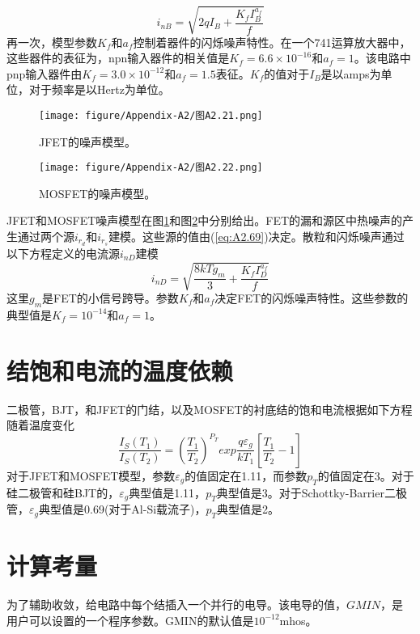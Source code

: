 \begin{equation}
    i_{nB} = \sqrt{2qI_B + \frac{K_fI^{a_f}_B}{f}}
    \label{eq:A2.72}
\end{equation}
再一次，模型参数$K_f$和$a_f$控制着器件的闪烁噪声特性。在一个741运算放大器\cite{ref-9}中，这些器件的表征为，npn输入器件的相关值是$K_f = 6.6\times10^{-16}$和$a_f = 1$。该电路中pnp输入器件由$K_f = 3.0\times10^{-12}$和$a_f = 1.5$表征。$K_f$的值对于$I_B$是以amps为单位，对于频率是以Hertz为单位。

\begin{figure}[htbp]
\small
    \centering
    \texttt{[image: figure/Appendix-A2/图A2.21.png]}
    \caption{JFET的噪声模型。}
    \label{图A2.21}
\end{figure}

\begin{figure}[htbp]
\small
    \centering
    \texttt{[image: figure/Appendix-A2/图A2.22.png]}
    \caption{MOSFET的噪声模型。}
    \label{图A2.22}
\end{figure}

JFET和MOSFET噪声模型在图\ref{图A2.21}和图\ref{图A2.22}中分别给出。FET的漏和源区中热噪声的产生通过两个源$i_{r_d}$和$i_{r_s}$建模。这些源的值由(\ref{eq:A2.69})决定。散粒和闪烁噪声通过以下方程定义的电流源$i_{nD}$建模
\begin{equation}
    i_{nD} = \sqrt{\frac{8kTg_m}{3} + \frac{K_fI^{a_f}_D}{f}}
    \label{eq:A2.73}
\end{equation}
这里$g_m$是FET的小信号跨导。参数$K_f$和$a_f$决定FET的闪烁噪声特性。这些参数的典型值是$K_f = 10^{-14}$和$a_f = 1$\cite{ref-95}。

\section{结饱和电流的温度依赖}
二极管，BJT，和JFET的门结，以及MOSFET的衬底结的饱和电流根据如下方程随着温度变化
\begin{equation}
    \frac{I_S(T_1)}{I_S(T_2)} = (\frac{T_1}{T_2})^{P_T}exp{\frac{q\varepsilon_g}{kT_1}[\frac{T_1}{T_2}-1]}
    \label{eq:A2.74}
\end{equation}
对于JFET和MOSFET模型，参数$\varepsilon_g$的值固定在1.11，而参数$p_T$的值固定在3。对于硅二极管和硅BJT的，$\varepsilon_g$典型值是1.11，$p_T$典型值是3。对于Schottky-Barrier二极管，$\varepsilon_g$典型值是0.69(对于Al-Si载流子)，$p_T$典型值是2。

\section{计算考量}
为了辅助收敛，给电路中每个结插入一个并行的电导。该电导的值，$GMIN$，是用户可以设置的一个程序参数。GMIN的默认值是$10^{-12}$mhos。

